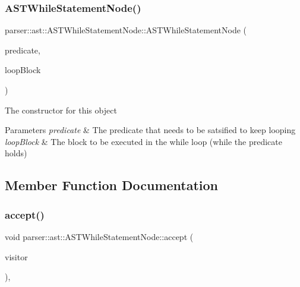 \subsubsection{\texorpdfstring{A\+S\+T\+While\+Statement\+Node()}{ASTWhileStatementNode()}}
{\footnotesize\ttfamily parser\+::ast\+::\+A\+S\+T\+While\+Statement\+Node\+::\+A\+S\+T\+While\+Statement\+Node (\begin{DoxyParamCaption}\item[{std\+::unique\+\_\+ptr$<$ \hyperlink{classparser_1_1ast_1_1ASTExprNode}{A\+S\+T\+Expr\+Node} $>$}]{predicate,  }\item[{std\+::unique\+\_\+ptr$<$ \hyperlink{classparser_1_1ast_1_1ASTBlockStatementNode}{A\+S\+T\+Block\+Statement\+Node} $>$}]{loop\+Block }\end{DoxyParamCaption})}

The constructor for this object 
\begin{DoxyParams}{Parameters}
{\em predicate} & The predicate that needs to be satsified to keep looping \\
\hline
{\em loop\+Block} & The block to be executed in the while loop (while the predicate holds) \\
\hline
\end{DoxyParams}


\subsection{Member Function Documentation}
\mbox{\label{classparser_1_1ast_1_1ASTWhileStatementNode_a448a46d9dbde688562ada266192735c8}} 
\subsubsection{\texorpdfstring{accept()}{accept()}}
{\footnotesize\ttfamily void parser\+::ast\+::\+A\+S\+T\+While\+Statement\+Node\+::accept (\begin{DoxyParamCaption}\item[{\hyperlink{classvisitor_1_1Visitor}{visitor\+::\+Visitor} $\ast$}]{visitor }\end{DoxyParamCaption})\hspace{0.3cm}{\ttfamily [override]}, {\ttfamily [virtual]}}

